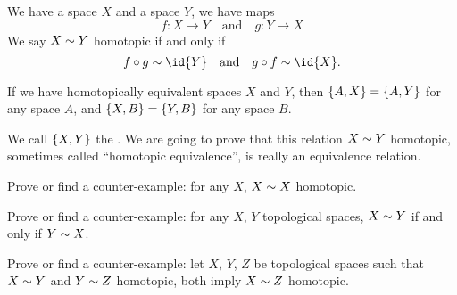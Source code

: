We have a space $X$ and a space $Y$, we have maps
\begin{equation}
f\colon X\to Y\quad\mbox{and}\quad g\colon Y\to X
\end{equation}
We say $X\sim Y$ homotopic if and only if
\begin{equation}
f\circ g\homotopic\id{Y}\quad\mbox{and}\quad g\circ
f\homotopic\id{X}.
\end{equation}
\begin{thm}
If we have homotopically equivalent spaces $X$ and $Y$, then
$\homotopyClass(A,X)=\homotopyClass(A,Y)$ for any space $A$, and
$\homotopyClass(X,B)=\homotopyClass(Y,B)$ for any space $B$.
\end{thm}
We call $\homotopyClass(X,Y)$ the .
We are going to prove that this relation $X\sim Y$
homotopic, sometimes called ``homotopic equivalence'', is really
an equivalence relation.
\exercises
\begin{xca}[Reflexivity]
Prove or find a counter-example: for any $X$, $X\sim X$
homotopic. 
\end{xca}
\begin{xca}[Symmetry]
Prove or find a counter-example: for any $X$, $Y$ topological
spaces, $X\sim Y$ if and only if $Y\sim X$.
\end{xca}
\begin{xca}[Transitivity]
Prove or find a counter-example: let $X$, $Y$, $Z$ be topological
spaces such that $X\sim Y$ and $Y\sim Z$ homotopic,
both imply  $X\sim Z$ homotopic.
\end{xca}
